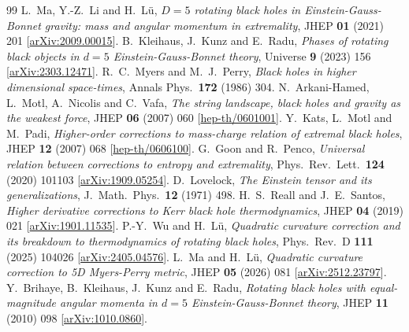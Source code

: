 \documentclass[11pt,a4paper]{article}
\begin{document}
\begin{thebibliography}{99}
  L.~Ma, Y.-Z.~Li and H.~L\"u,
  \emph{$D=5$ rotating black holes in Einstein-Gauss-Bonnet gravity: mass and
  angular momentum in extremality},
  JHEP \textbf{01} (2021) 201
  [\href{https://arxiv.org/abs/2009.00015}{arXiv:2009.00015}].
  B.~Kleihaus, J.~Kunz and E.~Radu,
  \emph{Phases of rotating black objects in $d=5$ Einstein-Gauss-Bonnet theory},
  Universe \textbf{9} (2023) 156
  [\href{https://arxiv.org/abs/2303.12471}{arXiv:2303.12471}].
  R.~C.~Myers and M.~J.~Perry,
  \emph{Black holes in higher dimensional space-times},
  Annals Phys.\ \textbf{172} (1986) 304.
  N.~Arkani-Hamed, L.~Motl, A.~Nicolis and C.~Vafa,
  \emph{The string landscape, black holes and gravity as the weakest force},
  JHEP \textbf{06} (2007) 060 [\href{https://arxiv.org/abs/hep-th/0601001}{hep-th/0601001}].
  Y.~Kats, L.~Motl and M.~Padi,
  \emph{Higher-order corrections to mass-charge relation of extremal black holes},
  JHEP \textbf{12} (2007) 068 [\href{https://arxiv.org/abs/hep-th/0606100}{hep-th/0606100}].
  G.~Goon and R.~Penco,
  \emph{Universal relation between corrections to entropy and extremality},
  Phys.\ Rev.\ Lett.\ \textbf{124} (2020) 101103
  [\href{https://arxiv.org/abs/1909.05254}{arXiv:1909.05254}].
  D.~Lovelock,
  \emph{The Einstein tensor and its generalizations},
  J.\ Math.\ Phys.\ \textbf{12} (1971) 498.
  H.~S.~Reall and J.~E.~Santos,
  \emph{Higher derivative corrections to Kerr black hole thermodynamics},
  JHEP \textbf{04} (2019) 021
  [\href{https://arxiv.org/abs/1901.11535}{arXiv:1901.11535}].
  P.-Y.~Wu and H.~L\"u,
  \emph{Quadratic curvature correction and its breakdown to thermodynamics of
  rotating black holes},
  Phys.\ Rev.\ D \textbf{111} (2025) 104026
  [\href{https://arxiv.org/abs/2405.04576}{arXiv:2405.04576}].
  L.~Ma and H.~L\"u,
  \emph{Quadratic curvature correction to 5D Myers-Perry metric},
  JHEP \textbf{05} (2026) 081
  [\href{https://arxiv.org/abs/2512.23797}{arXiv:2512.23797}].
  Y.~Brihaye, B.~Kleihaus, J.~Kunz and E.~Radu,
  \emph{Rotating black holes with equal-magnitude angular momenta in $d=5$
  Einstein-Gauss-Bonnet theory},
  JHEP \textbf{11} (2010) 098
  [\href{https://arxiv.org/abs/1010.0860}{arXiv:1010.0860}].

\end{thebibliography}
\end{document}

